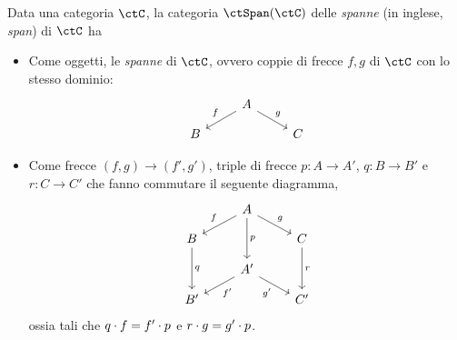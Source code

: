 \begin{definition}\label{def_span_e_cospan}
 Data una categoria \(\ctC\), la categoria \(\ctSpan(\ctC)\) delle \emph{spanne} (in inglese, \emph{span}) di \(\ctC\) ha
 \begin{itemize}
  \item Come oggetti, le \emph{spanne} di \(\ctC\), ovvero coppie di frecce \(f,g\) di \(\ctC\) con lo stesso dominio:
        \[
         \begin{tikzcd}[row sep=small]
          & A \ar{dl}[swap]{f} \ar{dr}{g} \\
          B && C
         \end{tikzcd}
        \]
  \item Come frecce \((f,g)\to (f',g')\), triple di frecce \(p\colon A\to A'\), \(q\colon B\to B'\) e \(r\colon C\to C'\) che fanno commutare il seguente diagramma,
        \begin{equation}
         \begin{tikzcd}[row sep=small]
          & A \ar{dd}{p} \ar{dl}[swap]{f} \ar{dr}{g} \\
          B \ar{dd}{q} && C \ar{dd}{r} \\
          & A' \ar{dl}{f'} \ar{dr}[swap]{g'} \\
          B' && C'
         \end{tikzcd}
         \label{mor_spanne}
        \end{equation}
        ossia tali che \(q\cdot f=f'\cdot p\) e \(r\cdot g=g'\cdot p\).
 \end{itemize}


\end{definition}
